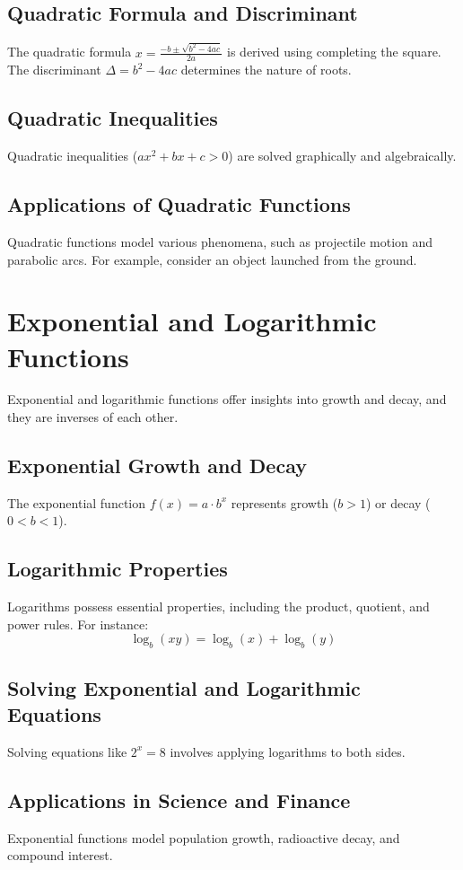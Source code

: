 \documentclass{article}
\begin{document}
\subsection{Quadratic Formula and Discriminant}
The quadratic formula \(x = \frac{-b \pm \sqrt{b^2 - 4ac}}{2a}\) is derived using completing the square. The discriminant \(\Delta = b^2 - 4ac\) determines the nature of roots.

\subsection{Quadratic Inequalities}
Quadratic inequalities (\(ax^2 + bx + c > 0\)) are solved graphically and algebraically.

\subsection{Applications of Quadratic Functions}
Quadratic functions model various phenomena, such as projectile motion and parabolic arcs. For example, consider an object launched from the ground.

\section{Exponential and Logarithmic Functions}
Exponential and logarithmic functions offer insights into growth and decay, and they are inverses of each other.

\subsection{Exponential Growth and Decay}
The exponential function \(f(x) = a \cdot b^x\) represents growth (\(b > 1\)) or decay (\(0 < b < 1\)).

\subsection{Logarithmic Properties}
Logarithms possess essential properties, including the product, quotient, and power rules. For instance:
\[ \log_b(xy) = \log_b(x) + \log_b(y) \]

\subsection{Solving Exponential and Logarithmic Equations}
Solving equations like \(2^x = 8\) involves applying logarithms to both sides.

\subsection{Applications in Science and Finance}
Exponential functions model population growth, radioactive decay, and compound interest.
\end{document}
